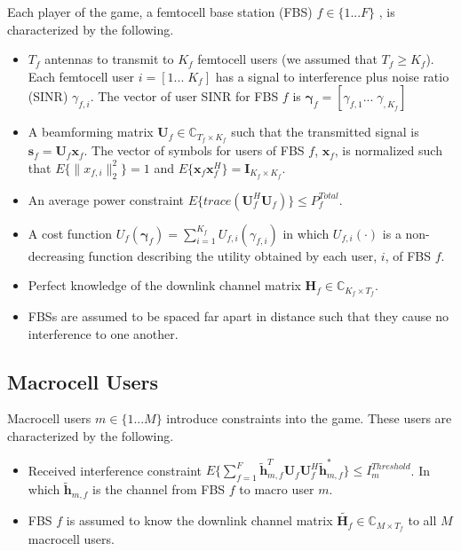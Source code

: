 \documentclass[12pt,a4paper]{report}
\begin{document}
Each player of the game, a femtocell base station (FBS) $f \in \{1 ... F\}$ , is characterized by the following.
\begin{itemize}
\item 
$T_{f}$ antennas to transmit to $K_{f}$ femtocell users (we assumed that $T_{f} \geq K_{f}$). Each femtocell user $i = [1... \;K_{f}]$ has a signal to interference plus noise ratio (SINR) $\gamma_{f,i}$. The vector of user SINR for FBS $f$ is $\boldsymbol{\gamma}_{f} = [\gamma_{f,1}...\; \gamma_{,K_{f}}]$
\\
\item 
	A beamforming matrix $\mathbf{U}_{f} \in \mathbb{C}_{T_{f} \times K_{f}}$ such that the transmitted 		
	signal is $\mathbf{s}_{f
	}= \mathbf{U}_{f}\mathbf{x}_{f}$. The 		
	vector of symbols for users of FBS $f$, $\mathbf{x}_{f}$, is  normalized such that $E\{\|x_{f,i}
	\|_2^2\}=1$ and $E\{\mathbf{x}_{f}\mathbf{x}_{f}^H\}=\mathbf{I}_{K_{f} \times K_{f}}$.
\\
\item 
	An average power constraint $E\{trace(\mathbf{U}_{f}^H\mathbf{U}_{f})\} \leq P^{Total}_{f} $.

\item 
	A cost function $U_{f}(\boldsymbol{\gamma}_{f}) =
	\sum_{i=1}^{K_{f}}
    	 U_{f,i}(\gamma_{f,i}) $
    	in which $U_{f,i}(\cdot)$ is a non-decreasing function describing the utility obtained by each user, $i$, of FBS $f$.

\item 
	Perfect knowledge of the downlink channel matrix $\mathbf{H}_f \in \mathbb{C}_{K_{f} \times T_{f}} $.
\\
\item
	 FBSs are assumed to be spaced far apart in distance such that they cause no interference to one another.
\end{itemize}

\subsection{Macrocell Users}
Macrocell users $m \in \{1 ... M\}$ introduce constraints into the game. These users are characterized by the following.

\begin{itemize}
\item 
	Received interference constraint
	$E\{\sum^F_{f=1} \mathbf{\tilde{h}}_{m,f}^T  \mathbf{U}_{f}					
	\mathbf{U}_{f}^{H} \mathbf{\tilde{h}}_{m,f}^*\} \leq I^{Threshold}		
	_{m} $. In which $\mathbf{\tilde{h}}_{m,f}$ is the channel from FBS $f$ to macro user $m$.

\item 
	FBS $f$ is assumed to know the downlink channel matrix $\tilde{\mathbf{H}_{f}} \in \mathbb{C}_{M \times T_{f}}$ to all $M$ macrocell users.
\\
\end{itemize}
\end{document}
